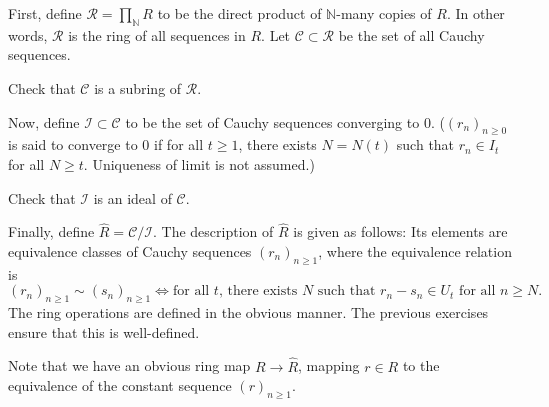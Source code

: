 \documentclass[12pt]{article}
\begin{document}
First, define $\mathcal{R} = \prod_{\mathbb{N}} R$ to be the direct product of $\mathbb{N}$-many copies of $R$. In other words, $\mathcal{R}$ is the ring of all sequences in $R$. \newline
Let $\mathcal{C} \subset \mathcal{R}$ be the set of all Cauchy sequences.

\begin{exe}
	Check that $\mathcal{C}$ is a subring of $\mathcal{R}$.
\end{exe}

Now, define $\mathcal{I} \subset \mathcal{C}$ to be the set of Cauchy sequences converging to $0$. ($(r_{n})_{n \ge 0}$ is said to converge to $0$ if for all $t \ge 1$, there exists $N = N(t)$ such that $r_{n} \in I_{t}$ for all $N \ge t$. Uniqueness of limit is not assumed.)

\begin{exe}
	Check that $\mathcal{I}$ is an ideal of $\mathcal{C}$.
\end{exe}

Finally, define $\widehat{R} = \mathcal{C}/\mathcal{I}$. The description of $\widehat{R}$ is given as follows: Its elements are equivalence classes of Cauchy sequences $(r_{n})_{n \ge 1}$, where the equivalence relation is
\begin{equation*} 
	(r_{n})_{n \ge 1} \sim (s_{n})_{n \ge 1} \Leftrightarrow \text{for all $t$, there exists $N$ such that $r_{n} - s_{n} \in U_{t}$ for all $n \ge N$}.
\end{equation*}
The ring operations are defined in the obvious manner. The previous exercises ensure that this is well-defined.

Note that we have an obvious ring map $R \to \widehat{R}$, mapping $r \in R$ to the equivalence of the constant sequence $(r)_{n \ge 1}$.
\end{document}
